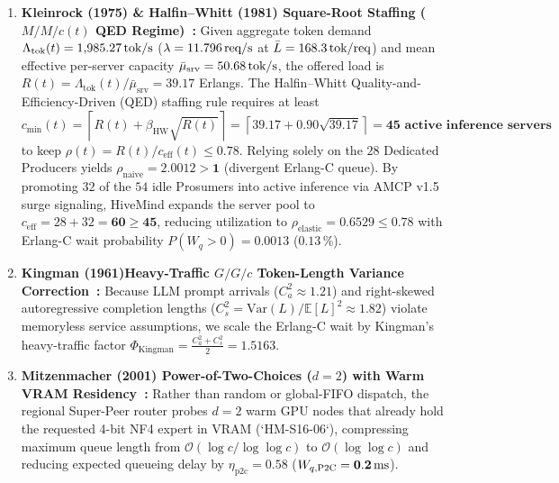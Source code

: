 \documentclass[11pt,a4paper]{article}
\begin{document}
\begin{enumerate}[leftmargin=1.8em]
    \item \textbf{Kleinrock (1975) \& Halfin--Whitt (1981) Square-Root Staffing ($M/M/c(t)$ QED Regime)~\cite{kleinrock1975queueing,halfin1981heavy}:} Given aggregate token demand $\Lambda_{\text{tok}}(t) = 1{,}985.27\text{\,tok/s}$ ($\lambda = 11.796\text{\,req/s}$ at $\bar{L} = 168.3\text{\,tok/req}$) and mean effective per-server capacity $\bar{\mu}_{\text{srv}} = 50.68\text{\,tok/s}$, the offered load is $R(t) = \Lambda_{\text{tok}}(t)/\bar{\mu}_{\text{srv}} = 39.17$ Erlangs. The Halfin--Whitt Quality-and-Efficiency-Driven (QED) staffing rule requires at least
    \begin{equation}
        c_{\text{min}}(t) = \left\lceil R(t) + \beta_{\text{HW}}\sqrt{R(t)} \right\rceil = \left\lceil 39.17 + 0.90\sqrt{39.17} \right\rceil = \mathbf{45\text{ active inference servers}}
    \end{equation}
    to keep $\rho(t) = R(t)/c_{\text{eff}}(t) \le 0.78$. Relying solely on the $28$ Dedicated Producers yields $\rho_{\text{naive}} = \mathbf{2.0012 > 1}$ (divergent Erlang-C queue). By promoting $32$ of the $54$ idle Prosumers into active inference via AMCP v1.5 surge signaling, HiveMind expands the server pool to $c_{\text{eff}} = 28 + 32 = \mathbf{60 \ge 45}$, reducing utilization to \textbf{$\rho_{\text{elastic}} = 0.6529 \le 0.78$} with Erlang-C wait probability $P(W_q > 0) = \mathbf{0.0013}$ ($0.13\,\%$).
    \item \textbf{Kingman (1961)Heavy-Traffic $G/G/c$ Token-Length Variance Correction~\cite{kingman1961single}:} Because LLM prompt arrivals ($C_a^2 \approx 1.21$) and right-skewed autoregressive completion lengths ($C_s^2 = \text{Var}(L)/\mathbb{E}[L]^2 \approx 1.82$) violate memoryless service assumptions, we scale the Erlang-C wait by Kingman's heavy-traffic factor $\Phi_{\text{Kingman}} = \frac{C_a^2 + C_s^2}{2} = \mathbf{1.5163}$.
    \item \textbf{Mitzenmacher (2001) Power-of-Two-Choices ($d=2$) with Warm VRAM Residency~\cite{mitzenmacher2001power}:} Rather than random or global-FIFO dispatch, the regional Super-Peer router probes $d=2$ warm GPU nodes that already hold the requested 4-bit NF4 expert in VRAM (`HM-S16-06`), compressing maximum queue length from $\mathcal{O}(\log c / \log\log c)$ to $\mathcal{O}(\log\log c)$ and reducing expected queueing delay by $\eta_{\text{p2c}} = \mathbf{0.58}$ ($W_{q,\text{P2C}} = \mathbf{0.2\text{\,ms}}$).

\end{enumerate}
\end{document}
